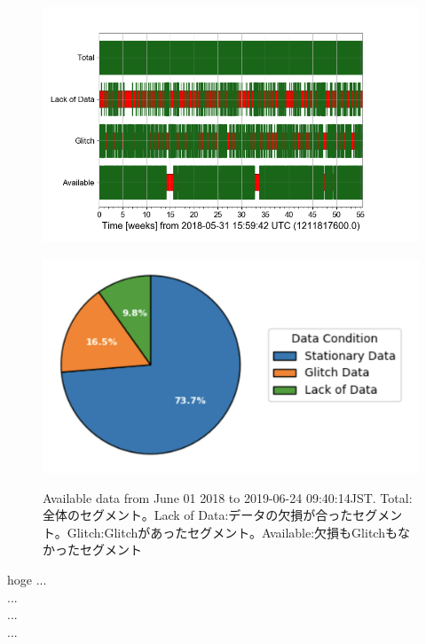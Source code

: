 \begin{figure}[H]
  \begin{minipage}[b]{0.65\hsize}
    \includegraphics[width=18.0cm]{./img_chap3/img317.png}
    \label{img:img317_a}
  \end{minipage}
  \begin{minipage}[b]{0.65\hsize}
    \centering              
    \includegraphics[width=13.0cm]{./img_chap3/img323.png}
    \label{img:img317_b}
  \end{minipage}
  \caption{Available data from June 01 2018 to 2019-06-24 09:40:14JST. Total:全体のセグメント。Lack of Data:データの欠損が合ったセグメント。Glitch:Glitchがあったセグメント。Available:欠損もGlitchもなかったセグメント}\label{img:img317}
\end{figure}

hoge
...\\
...\\
...\\
...\\

